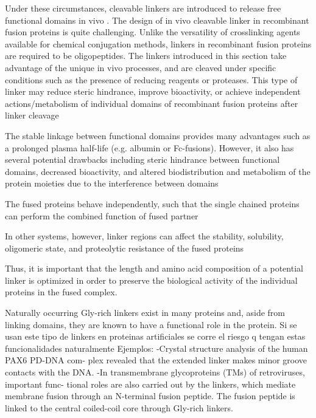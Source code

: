 Under these circumstances, cleavable linkers are introduced to release free functional
domains in vivo . The design of in vivo cleavable linker in recombinant fusion proteins is
quite challenging. Unlike the versatility of crosslinking agents available for chemical
conjugation methods, linkers in recombinant fusion proteins are required to be
oligopeptides. The linkers introduced in this section take advantage of the unique in vivo
processes, and are cleaved under specific conditions such as the presence of reducing
reagents or proteases. This type of linker may reduce steric hindrance, improve bioactivity,
or achieve independent actions/metabolism of individual domains of recombinant fusion
proteins after linker cleavage





The stable linkage between
functional domains provides many advantages such as a prolonged plasma half-life (e.g.
albumin or Fc-fusions). However, it also has several potential drawbacks including steric
hindrance between functional domains, decreased bioactivity, and altered biodistribution and
metabolism of the protein moieties due to the interference between domains 

The fused proteins behave independently, such that the single chained proteins can perform the combined function of fused partner

In other systems, however, linker regions can affect the stability, solubility, oligomeric state, and proteolytic resistance of the fused proteins

Thus, it is important that the length and amino acid composition of a potential linker is optimized in order to preserve the biological activity of the individual proteins in the fused complex.


Naturally occurring Gly-rich linkers exist in many proteins and, aside from linking domains, they are known to have a functional role in the protein. 
Si se usan este tipo de linkers en proteinas artificiales se corre el riesgo q tengan estas funcionalidades naturalmente
Ejemplos: 
-Crystal structure analysis of the human PAX6 PD-DNA com-
plex revealed that the extended linker makes minor
groove contacts with the DNA. 
-In transmembrane glycoproteins (TMs) of retroviruses, important func-
tional roles are also carried out by the linkers, which
mediate membrane fusion through an N-terminal
fusion peptide. The fusion peptide is linked to the
central coiled-coil core through Gly-rich linkers.






